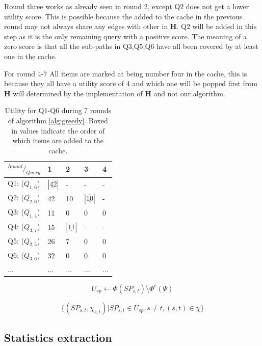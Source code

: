 Round three works as already seen in round 2, except Q2 does not get a lower utility score. This is possible because the \spath added to the cache in the previous round may not always share any edges with other \spaths in \textbf{H}. Q2 will be added in this step as it is the only remaining query with a positive score. The meaning of a zero score is that all the sub-paths in Q3,Q5,Q6 have all been covered by at least one \spath in the cache.

For round 4-7 All items are marked at being number four in the cache, this is because they all have a utility score of 4 and which one will be popped first from \textbf{H} will determined by the implementation of \textbf{H} and not our algorithm.


\begin{table}
\center
\begin{tabular}{| l| l| l| l| l|}\hline
$^{Round}/_{Query}$ 	& 1 	& 2 		& 3 	& 4 	\\\hline
Q1: ($Q_{1,6}$)		& $| \underline{\overline{42}}|$ 	& -	& -  	& - \\\hline
Q2: ($Q_{2,6}$)		& 42 	& 10	& $| \underline{\overline{10}} |$	& -\\\hline
Q3: ($Q_{1,4}$)		& 11	& 0	& 0	& 0	\\\hline
Q4: ($Q_{4,7}$)		& 15	& $| \underline{\overline{11}} |$	& -	& -  \\\hline
Q5: ($Q_{2,5}$)		& 26	& 7	& 0	& 0	\\\hline
Q6: ($Q_{3,6}$)		& 32	& 0	& 0	& 0	\\\hline
... & ... & ... & ... & ... \\\hline
\end{tabular}
\label{tab:steputil}
\caption{Utility for Q1-Q6 during 7 rounds of algorithm \ref{alg:greedy}. Boxed in values indicate the order of which items are added to the cache.}
\end{table}


\begin{equation} \label{eq:usp}
U_{sp} \leftarrow \Phi(SP_{s,t}) \setminus \Phi^c(\Psi)
\end{equation}

\begin{equation} \label{eq:score}
\{ (SP_{s,t}, \chi_{s,t}) | SP_{s,t} \in U_{sp}, s \neq t, (s,t) \in \chi \}
\end{equation}





\subsection{Statistics extraction}

